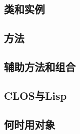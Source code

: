 \documentclass{ctexart}
\begin{document}
\subsection{类和实例}
\label{sec-25-3}
\subsection{方法}
\label{sec-25-4}
\subsection{辅助方法和组合}
\label{sec-25-5}
\subsection{CLOS与Lisp}
\label{sec-25-6}
\subsection{何时用对象}
\label{sec-25-7}
\end{document}
